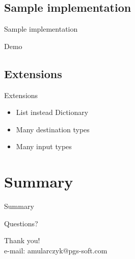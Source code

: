 \documentclass{beamer}
\begin{document}
\subsection*{Sample implementation}
\begin{frame}{Sample implementation}
\begin{center}
\Huge{Demo}
\end{center}
\end{frame}

\subsection*{Extensions}
\begin{frame}{Extensions}
\begin{center}
\Large{\begin{itemize}
	\item List instead Dictionary
	\item Many destination types
	\item Many input types
\end{itemize}}
\end{center}
\end{frame}	


\section{Summary}

\begin{frame}{}
\begin{center}
\Huge{Summary}
\end{center}
\end{frame}

\begin{frame}{Questions?}
\begin{center}
\Huge{Thank you!}\\
\Large{e-mail: amularczyk@pgs-soft.com}
\end{center}
\end{frame}
\end{document}
